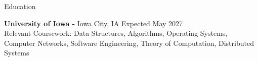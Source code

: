 \documentclass{resume} %
\begin{document}
%



\begin{rSection}{Education}

{\bf University of Iowa -} Iowa City, IA  \hfill {Expected May 2027}\\ 
Relevant Coursework: Data Structures, Algorithms, Operating Systems, Computer Networks, Software Engineering, Theory of Computation, Distributed Systems


\end{rSection}

\end{document}
